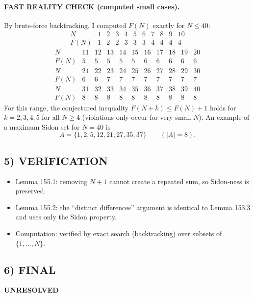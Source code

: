 \paragraph{FAST REALITY CHECK (computed small cases).}
By brute-force backtracking, I computed $F(N)$ exactly for $N\le 40$:
\[
\begin{array}{c|cccccccccc}
N & 1&2&3&4&5&6&7&8&9&10 \\ \hline
F(N) & 1&2&2&3&3&3&4&4&4&4
\end{array}
\]
\[
\begin{array}{c|cccccccccc}
N & 11&12&13&14&15&16&17&18&19&20 \\ \hline
F(N) & 5&5&5&5&5&6&6&6&6&6
\end{array}
\]
\[
\begin{array}{c|cccccccccc}
N & 21&22&23&24&25&26&27&28&29&30 \\ \hline
F(N) & 6&6&7&7&7&7&7&7&7&7
\end{array}
\]
\[
\begin{array}{c|cccccccccc}
N & 31&32&33&34&35&36&37&38&39&40 \\ \hline
F(N) & 8&8&8&8&8&8&8&8&8&8
\end{array}
\]
For this range, the conjectured inequality $F(N+k)\le F(N)+1$ holds for $k=2,3,4,5$ for all $N\ge 4$ (violations only occur for very small $N$).
An example of a maximum Sidon set for $N=40$ is
\[
A=\{1,2,5,12,21,27,35,37\}\qquad(|A|=8).
\]

\subsection*{5) VERIFICATION}
\begin{itemize}
\item Lemma 155.1: removing $N+1$ cannot create a repeated sum, so Sidon-ness is preserved.
\item Lemma 155.2: the ``distinct differences'' argument is identical to Lemma 153.3 and uses only the Sidon property.
\item Computation: verified by exact search (backtracking) over subsets of $\{1,\dots,N\}$.
\end{itemize}

\subsection*{6) FINAL}
\textbf{UNRESOLVED}

